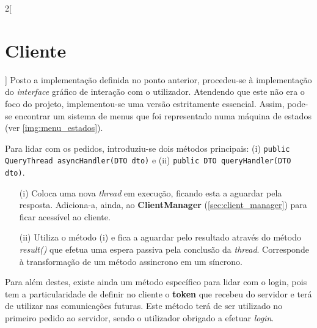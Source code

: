 \documentclass[a4paper,11pt]{article}
\begin{document}
\begin{multicols}{2}[\section{Cliente}] \label{sec:cliente}
    Posto a implementação definida no ponto anterior, procedeu-se à implementação
    do \textit{interface} gráfico de interação com o utilizador.
    Atendendo que este não era o foco do projeto, implementou-se uma versão estritamente
    essencial.
    Assim, pode-se encontrar um sistema de menus que foi representado numa máquina
    de estados (ver \ref{img:menu_estados}).
    
    Para lidar com os pedidos, introduziu-se dois métodos principais: (i) \texttt{public QueryThread asyncHandler(DTO dto)}
    e (ii) \texttt{public DTO queryHandler(DTO dto)}.
    \begin{itemize}
        \item[(i)]{
              Coloca uma nova \textit{thread} em execução, ficando esta a aguardar pela resposta.
              Adiciona-a, ainda, ao \textbf{ClientManager} (\ref{sec:client_manager}) para ficar acessível
              ao cliente.
              }
        \item[(ii)]{
              Utiliza o método (i) e fica a aguardar pelo resultado através do método
              \textit{result()} que efetua uma espera passiva pela conclusão da \textit{thread}.
              Corresponde à transformação de um método assincrono em um síncrono.
              }
    \end{itemize}
    Para além destes, existe ainda um método específico para lidar com o login,
    pois tem a particularidade de definir no cliente o \textbf{token} que recebeu
    do servidor e terá de utilizar nas comunicações futuras.
    Este método terá de ser utilizado no primeiro pedido ao servidor,
    sendo o utilizador obrigado a efetuar \textit{login}.
    

\end{multicols}
\end{document}
